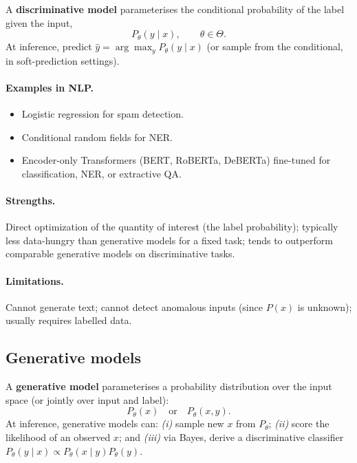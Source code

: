 \begin{definition}
A \textbf{discriminative model} parameterises the conditional probability of the label given the input,
\[ P_\theta(y \mid x), \qquad \theta \in \Theta. \]
At inference, predict $\hat{y} = \arg\max_y P_\theta(y \mid x)$ (or sample from the conditional, in soft-prediction settings).
\end{definition}

\paragraph{Examples in NLP.}
\begin{itemize}
    \item Logistic regression for spam detection.
    \item Conditional random fields for NER.
    \item Encoder-only Transformers (BERT, RoBERTa, DeBERTa) fine-tuned for classification, NER, or extractive QA.
\end{itemize}

\paragraph{Strengths.} Direct optimization of the quantity of interest (the label probability); typically less data-hungry than generative models for a fixed task; tends to outperform comparable generative models on discriminative tasks.

\paragraph{Limitations.} Cannot generate text; cannot detect anomalous inputs (since $P(x)$ is unknown); usually requires labelled data.

\subsection{Generative models}

\begin{definition}
A \textbf{generative model} parameterises a probability distribution over the input space (or jointly over input and label):
\[ P_\theta(x) \quad\text{or}\quad P_\theta(x, y). \]
At inference, generative models can: \emph{(i)} sample new $x$ from $P_\theta$; \emph{(ii)} score the likelihood of an observed $x$; and \emph{(iii)} via Bayes, derive a discriminative classifier $P_\theta(y \mid x) \propto P_\theta(x \mid y) P_\theta(y)$.
\end{definition}

